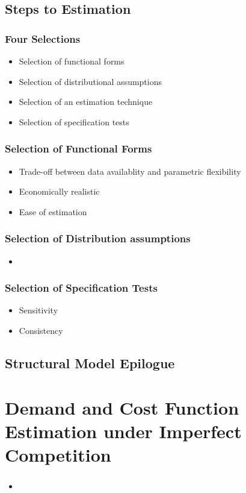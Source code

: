 \documentclass{beamer}
\begin{document}
\subsection{Steps to Estimation}
\begin{frame}
\frametitle{Four Selections}
\begin{itemize}
\item Selection of functional forms
\item Selection of distributional assumptions
\item Selection of an estimation technique
\item Selection of specification tests
\end{itemize}
\end{frame}

\begin{frame}
\frametitle{Selection of Functional Forms}
\begin{itemize}
\item Trade-off between data availablity and parametric flexibility
\item Economically realistic
\item Ease of estimation
\end{itemize}
\end{frame}

\begin{frame}
\frametitle{Selection of Distribution assumptions}
\begin{itemize}
\item 
\end{itemize}
\end{frame}

\begin{frame}
\frametitle{Selection of Specification Tests}
\begin{itemize}
\item Sensitivity
\item Consistency 
\end{itemize}
\end{frame}

\subsection{Structural Model Epilogue}
\begin{frame}
\end{frame}

\section{Demand and Cost Function Estimation under Imperfect Competition}
\begin{frame}
\frametitle{}
\begin{itemize}
\item 
\end{itemize}
\end{frame}
\end{document}
